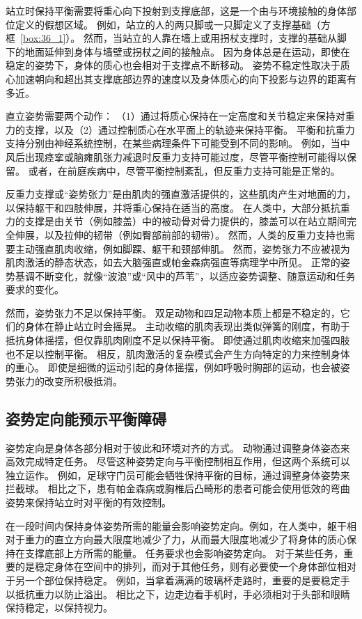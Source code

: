 站立时保持平衡需要将重心向下投射到支撑底部，这是一个由与环境接触的身体部位定义的假想区域。
例如，站立的人的两只脚或一只脚定义了支撑基础（方框~\ref{box:36_1}）。
然而，当站立的人靠在墙上或用拐杖支撑时，支撑的基础从脚下的地面延伸到身体与墙壁或拐杖之间的接触点。
因为身体总是在运动，即使在稳定的姿势下，身体的质心也会相对于支撑点不断移动。
姿势不稳定性取决于质心加速朝向和超出其支撑底部边界的速度以及身体质心的向下投影与边界的距离有多近。


直立姿势需要两个动作：
（1）通过将质心保持在一定高度和关节稳定来保持对重力的支撑，以及（2）通过控制质心在水平面上的轨迹来保持平衡。
平衡和抗重力支持分别由神经系统控制，在某些病理条件下可能受到不同的影响。
例如，当中风后出现痉挛或脑瘫肌张力减退时反重力支持可能过度，尽管平衡控制可能得以保留。
或者，在前庭疾病中，尽管平衡控制紊乱，但反重力支持可能是正常的。


反重力支撑或“姿势张力”是由肌肉的强直激活提供的，这些肌肉产生对地面的力，以保持躯干和四肢伸展，并将重心保持在适当的高度。
在人类中，大部分抵抗重力的支撑是由关节（例如膝盖）中的被动骨对骨力提供的，膝盖可以在站立期间完全伸展，以及拉伸的韧带（例如臀部前部的韧带）。
然而，人类的反重力支持也需要主动强直肌肉收缩，例如脚踝、躯干和颈部伸肌。
然而，姿势张力不应被视为肌肉激活的静态状态，如去大脑强直或帕金森病强直等病理学中所见。
正常的姿势基调不断变化，就像“波浪”或“风中的芦苇”，以适应姿势调整、随意运动和任务要求的变化。


然而，姿势张力不足以保持平衡。
双足动物和四足动物本质上都是不稳定的，它们的身体在静止站立时会摇晃。
主动收缩的肌肉表现出类似弹簧的刚度，有助于抵抗身体摇摆，但仅靠肌肉刚度不足以保持平衡。
即使通过肌肉收缩来加强四肢也不足以控制平衡。
相反，肌肉激活的复杂模式会产生方向特定的力来控制身体的重心。
即使是细微的运动引起的身体摇摆，例如呼吸时胸部的运动，也会被姿势张力的改变所积极抵消。



\subsection{姿势定向能预示平衡障碍}

姿势定向是身体各部分相对于彼此和环境对齐的方式。 动物通过调整身体姿态来高效完成特定任务。
尽管这种姿势定向与平衡控制相互作用，但这两个系统可以独立运作。
例如，足球守门员可能会牺牲保持平衡的目标，通过调整身体姿势来拦截球。
相比之下，患有帕金森病或胸椎后凸畸形的患者可能会使用低效的弯曲姿势来保持站立时对平衡的有效控制。


在一段时间内保持身体姿势所需的能量会影响姿势定向。例如，在人类中，躯干相对于重力的直立方向最大限度地减少了力，从而最大限度地减少了将身体的质心保持在支撑底部上方所需的能量。
任务要求也会影响姿势定向。
对于某些任务，重要的是稳定身体在空间中的排列，而对于其他任务，则有必要使一个身体部位相对于另一个部位保持稳定。
例如，当拿着满满的玻璃杯走路时，重要的是要稳定手以抵抗重力以防止溢出。
相比之下，边走边看手机时，手必须相对于头部和眼睛保持稳定，以保持视力。



